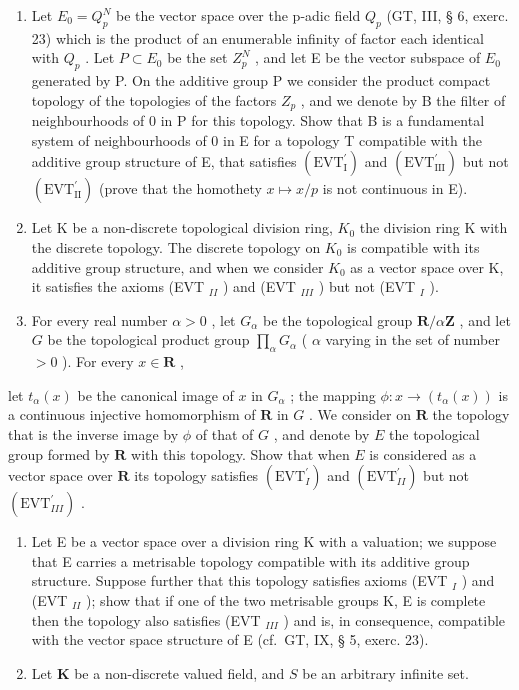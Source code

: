 \begin{enumerate}
\def\labelenumi{\arabic{enumi})}
\item
  Let \(E_{0}=Q_{p}^{N}\) be the vector space over the p-adic field \(Q_{p}\) (GT, III, § 6, exerc. 23) which is the product of an enumerable infinity of factor each identical with \(Q_{p}\) . Let \(P\subset E_{0}\) be the set \(Z_{p}^{N}\) , and let E be the vector subspace of \(E_{0}\) generated by P. On the additive group P we consider the product compact topology of the topologies of the factors \(Z_{p}\) , and we denote by B the filter of neighbourhoods of 0 in P for this topology. Show that B is a fundamental system of neighbourhoods of 0 in E for a topology T compatible with the additive group structure of E, that satisfies \((\mathrm{EVT}_{\mathrm{I}}^{\prime})\) and \((\mathrm{EVT}_{\mathrm{III}}^{\prime})\) but not \((\mathrm{EVT}_{\mathrm{II}}^{\prime})\) (prove that the homothety \(x\mapsto x/p\) is not continuous in E).
\item
  Let K be a non-discrete topological division ring, \(K_{0}\) the division ring K with the discrete topology. The discrete topology on \(K_{0}\) is compatible with its additive group structure, and when we consider \(K_{0}\) as a vector space over K, it satisfies the axioms (EVT \(_{II}\) ) and (EVT \(_{III}\) ) but not (EVT \(_{I}\) ).
\item
  For every real number \(\alpha > 0\) , let \(G_{\alpha}\) be the topological group \(\mathbf{R} / \alpha \mathbf{Z}\) , and let \(G\) be the topological product group \(\prod_{\alpha} G_{\alpha}\) ( \(\alpha\) varying in the set of number \(>0\) ). For every \(x \in \mathbf{R}\) ,
\end{enumerate}

let \(t_{\alpha}(x)\) be the canonical image of \(x\) in \(G_{\alpha}\) ; the mapping \(\phi : x \to (t_{\alpha}(x))\) is a continuous injective homomorphism of \(\mathbf{R}\) in \(G\) . We consider on \(\mathbf{R}\) the topology that is the inverse image by \(\phi\) of that of \(G\) , and denote by \(E\) the topological group formed by \(\mathbf{R}\) with this topology. Show that when \(E\) is considered as a vector space over \(\mathbf{R}\) its topology satisfies \((\mathrm{EVT}_{I}^{\prime})\) and \((\mathrm{EVT}_{II}^{\prime})\) but not \((\mathrm{EVT}_{III}^{\prime})\) .

\begin{enumerate}
\def\labelenumi{\arabic{enumi})}
\setcounter{enumi}{3}
\item
  Let E be a vector space over a division ring K with a valuation; we suppose that E carries a metrisable topology compatible with its additive group structure. Suppose further that this topology satisfies axioms (EVT \(_{I}\) ) and (EVT \(_{II}\) ); show that if one of the two metrisable groups K, E is complete then the topology also satisfies (EVT \(_{III}\) ) and is, in consequence, compatible with the vector space structure of E (cf.~GT, IX, § 5, exerc. 23).
\item
  Let \(\mathbf{K}\) be a non-discrete valued field, and \(S\) be an arbitrary infinite set.
\end{enumerate}

